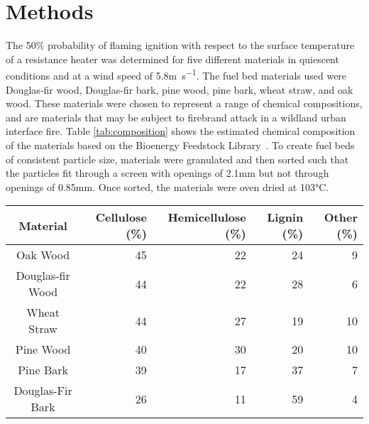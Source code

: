 \section{Methods}
\label{sec:methods3}
    The 50\% probability of flaming ignition with respect to the surface temperature of a resistance heater was determined for five different materials in quiescent conditions and at a wind speed of 5.8\si{\meter\per\second}. The fuel bed materials used were Douglas-fir wood, Douglas-fir bark, pine wood, pine bark, wheat straw, and oak wood. These materials were chosen to represent a range of chemical compositions, and are materials that may be subject to firebrand attack in a wildland urban interface fire. Table \ref{tab:composition} shows the estimated chemical composition of the materials based on the Bioenergy Feedstock Library~\cite{feedstock}. To create fuel beds of consistent particle size,  materials were granulated and then sorted such that the particles fit through a screen with openings of 2.1\si{\milli\meter} but not through openings of 0.85\si{\milli\meter}. Once sorted, the materials were oven dried at 103\si{\celsius}.
    \begin{table*}[hpbt]
        \caption{Proportion of cellulose, hemicellulose, and lignin of the materials tested estimated from the Bioenergy Feedstock Library~\cite{feedstock}}
        \centering
        \begin{tabular}{crrrr}
            Material & Cellulose (\%) & Hemicellulose (\%) & Lignin (\%) & Other (\%) \\
            \hline
            Oak Wood         & 45 & 22 & 24 & 9\\
            Douglas-fir Wood & 44 & 22 & 28 & 6\\
            Wheat Straw      & 44 & 27 & 19 & 10\\
            Pine Wood        & 40 & 30 & 20 & 10\\
            Pine Bark        & 39 & 17 & 37 & 7\\
            Douglas-Fir Bark & 26 & 11 & 59 & 4 
        \end{tabular}
        \label{tab:composition}
    \end{table*}
